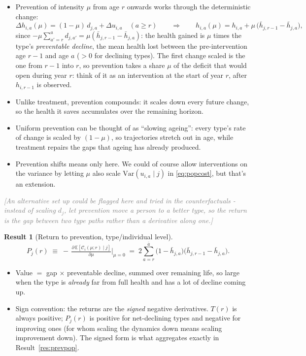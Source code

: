 \documentclass[11pt]{article}
\newtheorem{result}{Result}
\theoremstyle{remark}
\newcommand{\jnote}[1]{\textcolor{gray}{\textit{[#1]}}}
\newcommand{\E}{\mathbb{E}}
\newcommand{\Var}{\mathrm{Var}}
\begin{document}
\begin{itemize}
\item Prevention of intensity $\mu$ from age $r$ onwards works through the deterministic change:
\begin{equation}
\Delta h_{i,a}(\mu) = (1-\mu)\,d_{j,a} + \Delta u_{i,a} \quad (a\ge r)
\qquad\Longrightarrow\qquad
h_{i,a}(\mu) = h_{i,a} + \mu\,\bigl(\bar h_{j,r-1}-\bar h_{j,a}\bigr),
\end{equation}
since $-\mu\sum_{a'=r}^{a}d_{j,a'}=\mu(\bar h_{j,r-1}-\bar h_{j,a})$: the health gained is $\mu$ times the type's \emph{preventable decline}, the mean health lost between the pre-intervention age $r-1$ and age $a$ ($>0$ for declining types).
The first change scaled is the one from $r-1$ into $r$, so prevention takes a share $\mu$ of the deficit that would open during year $r$: think of it as an intervention at the start of year $r$, after $h_{i,r-1}$ is observed.
\item Unlike treatment, prevention compounds: it scales down every future change, so the health it saves accumulates over the remaining horizon.
\item Uniform prevention can be thought of as ``slowing ageing'': every type's rate of change is scaled by $(1-\mu)$, so trajectories stretch out in age, while treatment repairs the gaps that ageing has already produced.
\item Prevention shifts means only here. We could of course allow interventions on the variance by letting $\mu$ also scale $\Var(u_{i,a}\mid j)$ in \eqref{eq:popcost}, but that's an extension.
\end{itemize}

\jnote{An alternative set up could be flagged here and tried in the counterfactuals - instead of scaling $d_j$, let prevention move a person to a better type, so the return is the gap between two type paths rather than a derivative along one.}

\begin{result}[Return to prevention, type/individual level]\label{res:prevj}
\begin{equation}
P_j(r) \;\equiv\; -\,\tfrac{\partial\,\E[\mathcal{C}_i(\mu;r)\mid j]}{\partial\mu}\Big|_{\mu=0}
\;=\; 2\sum_{a=r}^{\bar a} \bigl(1-\bar h_{j,a}\bigr)\bigl(\bar h_{j,r-1}-\bar h_{j,a}\bigr).
\end{equation}
\end{result}

\begin{itemize}
\item Value $=$ gap $\times$ preventable decline, summed over remaining life, so large when the type is \emph{already} far from full health and has a lot of decline coming up.
\item Sign convention: the returns are the \emph{signed} negative derivatives.
$T(r)$ is always positive; $P_j(r)$ is positive for net-declining types and negative for improving ones (for whom scaling the dynamics down means scaling improvement down).
The signed form is what aggregates exactly in Result~\ref{res:prevpop}.
\end{itemize}
\end{document}
